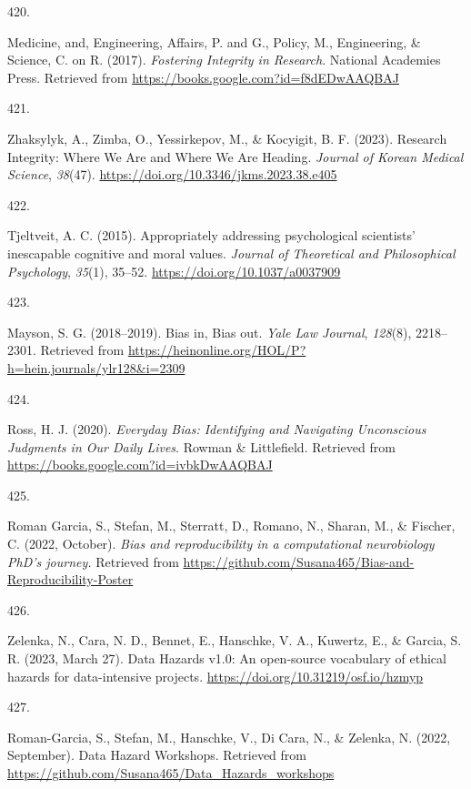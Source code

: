 \documentclass[
  11pt,
  letterpaper,
]{scrreprt}
\newlength{\cslhangindent}
\newlength{\csllabelwidth}
\newenvironment{CSLReferences}[2] %
 {\begin{list}{}{%
  \setlength{\itemindent}{0pt}
  \setlength{\leftmargin}{0pt}
  \setlength{\parsep}{0pt}
  \ifodd #1
   \setlength{\leftmargin}{\cslhangindent}
   \setlength{\itemindent}{-1\cslhangindent}
  \fi
  \setlength{\itemsep}{#2\baselineskip}}}
 {\end{list}}
\newcommand{\CSLLeftMargin}[1]{\parbox[t]{\csllabelwidth}{\strut#1\strut}}
\newcommand{\CSLRightInline}[1]{\parbox[t]{\linewidth - \csllabelwidth}{\strut#1\strut}}
\begin{document}
\begin{CSLReferences}{0}{0}
\CSLLeftMargin{420. }%
\CSLRightInline{Medicine, and, Engineering, Affairs, P. and G., Policy,
M., Engineering, \& Science, C. on R. (2017). \emph{Fostering
{Integrity} in {Research}}. National Academies Press. Retrieved from
\url{https://books.google.com?id=f8dEDwAAQBAJ}}

\CSLLeftMargin{421. }%
\CSLRightInline{Zhaksylyk, A., Zimba, O., Yessirkepov, M., \& Kocyigit,
B. F. (2023). Research {Integrity}: {Where We Are} and {Where We Are
Heading}. \emph{Journal of Korean Medical Science}, \emph{38}(47).
\url{https://doi.org/10.3346/jkms.2023.38.e405}}

\CSLLeftMargin{422. }%
\CSLRightInline{Tjeltveit, A. C. (2015). Appropriately addressing
psychological scientists' inescapable cognitive and moral values.
\emph{Journal of Theoretical and Philosophical Psychology},
\emph{35}(1), 35--52. \url{https://doi.org/10.1037/a0037909}}

\CSLLeftMargin{423. }%
\CSLRightInline{Mayson, S. G. (2018--2019). Bias in, {Bias} out.
\emph{Yale Law Journal}, \emph{128}(8), 2218--2301. Retrieved from
\url{https://heinonline.org/HOL/P?h=hein.journals/ylr128&i=2309}}

\CSLLeftMargin{424. }%
\CSLRightInline{Ross, H. J. (2020). \emph{Everyday {Bias}: {Identifying}
and {Navigating Unconscious Judgments} in {Our Daily Lives}}. Rowman \&
Littlefield. Retrieved from
\url{https://books.google.com?id=ivbkDwAAQBAJ}}

\CSLLeftMargin{425. }%
\CSLRightInline{Roman Garcia, S., Stefan, M., Sterratt, D., Romano, N.,
Sharan, M., \& Fischer, C. (2022, October). \emph{Bias and
reproducibility in a computational neurobiology {PhD}'s journey.}
Retrieved from
\url{https://github.com/Susana465/Bias-and-Reproducibility-Poster}}

\CSLLeftMargin{426. }%
\CSLRightInline{Zelenka, N., Cara, N. D., Bennet, E., Hanschke, V. A.,
Kuwertz, E., \& Garcia, S. R. (2023, March 27). Data {Hazards} v1.0: An
open-source vocabulary of ethical hazards for data-intensive projects.
\url{https://doi.org/10.31219/osf.io/hzmyp}}

\CSLLeftMargin{427. }%
\CSLRightInline{Roman-Garcia, S., Stefan, M., Hanschke, V., Di Cara, N.,
\& Zelenka, N. (2022, September). Data {Hazard Workshops}. Retrieved
from \url{https://github.com/Susana465/Data_Hazards_workshops}}


\end{CSLReferences}
\end{document}

